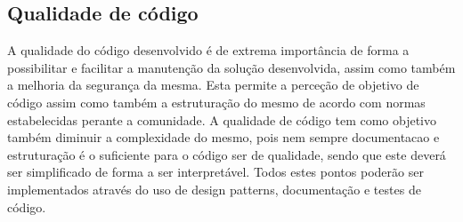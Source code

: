 \subsection{Qualidade de código}
A qualidade do código desenvolvido é de extrema importância de forma a possibilitar e facilitar a manutenção da solução desenvolvida, assim como também a melhoria da segurança da mesma. Esta permite a perceção de objetivo de código assim como também a estruturação do mesmo de acordo com normas estabelecidas perante a comunidade. A qualidade de código tem como objetivo também diminuir a complexidade do mesmo, pois nem sempre documentacao e estruturação é o suficiente para o código ser de qualidade, sendo que este deverá ser simplificado de forma a ser interpretável. Todos estes pontos poderão ser implementados através do uso de design patterns, documentação e testes de código.





\newpage


